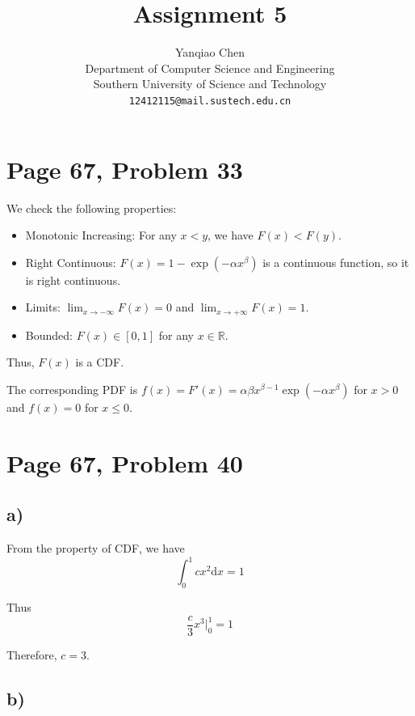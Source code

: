 \documentclass[a4paper, UTF-8]{article}
\theoremstyle{plain}
\begin{document}
\title{Assignment 5}

\author{Yanqiao Chen\\ 
  Department of Computer Science and Engineering\\
  Southern University of Science and Technology\\
  \texttt{12412115@mail.sustech.edu.cn}
  }


\maketitle

\section{Page 67, Problem 33}

We check the following properties: 

\begin{itemize} 
    \item Monotonic Increasing: For any $x < y$, we have $F(x) < F(y)$. 
    \item Right Continuous: $F(x) = 1 - \exp(-\alpha x^{\beta})$ is a continuous function, so it is right continuous.
    \item Limits: $\lim_{x \to -\infty} F(x) = 0$ and $\lim_{x \to +\infty} F(x) = 1$.
    \item Bounded: $F(x) \in [0, 1]$ for any $x \in \mathbb{R}$.
\end{itemize}

Thus, $F(x)$ is a CDF.

The corresponding PDF is $f(x) = F'(x) = \alpha \beta x^{\beta - 1} \exp(-\alpha x^{\beta})$ for $x > 0$ and $f(x) = 0$ for $x \leq 0$.

\section{Page 67, Problem 40}

\subsection{a)} 

From the property of CDF, we have 
$$
\int_{0}^1 cx^2 \mathrm{d}x = 1
$$

Thus 
$$
\frac{c}{3}x^3 \Big|_0^1 = 1
$$

Therefore, $c = 3$.

\subsection{b)} 
\end{document}
